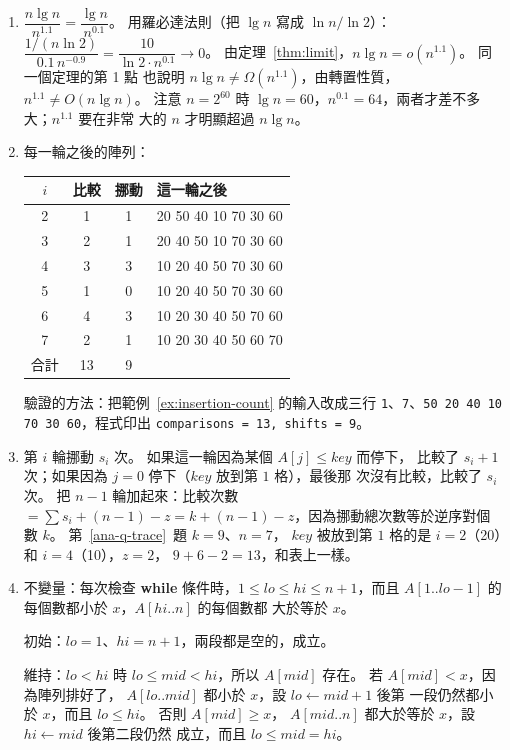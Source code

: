 \begin{enumerate}
\item $\dfrac{n \lg n}{n^{1.1}} = \dfrac{\lg n}{n^{0.1}}$。 用羅必達法則（把 $\lg n$
寫成 $\ln n / \ln 2$）：$\dfrac{1/(n \ln 2)}{0.1\, n^{-0.9}} = \dfrac{10}{\ln 2 \cdot
n^{0.1}} \to 0$。 由定理~\ref{thm:limit}，$n \lg n = o(n^{1.1})$。 同一個定理的第 1 點
也說明 $n \lg n \ne \Omega(n^{1.1})$，由轉置性質，$n^{1.1} \ne O(n \lg n)$。 注意
$n = 2^{60}$ 時 $\lg n = 60$，$n^{0.1} = 64$，兩者才差不多大；$n^{1.1}$ 要在非常
大的 $n$ 才明顯超過 $n \lg n$。

\item 每一輪之後的陣列：
\begin{center}
\begin{tabular}{cccl}
\toprule
$i$ & 比較 & 挪動 & 這一輪之後 \\
\midrule
2 & 1 & 1 & 20 50 40 10 70 30 60 \\
3 & 2 & 1 & 20 40 50 10 70 30 60 \\
4 & 3 & 3 & 10 20 40 50 70 30 60 \\
5 & 1 & 0 & 10 20 40 50 70 30 60 \\
6 & 4 & 3 & 10 20 30 40 50 70 60 \\
7 & 2 & 1 & 10 20 30 40 50 60 70 \\
\midrule
合計 & 13 & 9 & \\
\bottomrule
\end{tabular}
\end{center}
驗證的方法：把範例~\ref{ex:insertion-count} 的輸入改成三行
\texttt{1}、\texttt{7}、\texttt{50 20 40 10 70 30 60}，程式印出
\texttt{comparisons = 13, shifts = 9}。

\item 第 $i$ 輪挪動 $s_i$ 次。 如果這一輪因為某個 $A[j] \le \mathit{key}$ 而停下，
比較了 $s_i + 1$ 次；如果因為 $j = 0$ 停下（$\mathit{key}$ 放到第 $1$ 格），最後那
次沒有比較，比較了 $s_i$ 次。 把 $n - 1$ 輪加起來：比較次數 $= \sum s_i + (n - 1) - z
= k + (n - 1) - z$，因為挪動總次數等於逆序對個數 $k$。 第~\ref{ana-q-trace}~題
$k = 9$、$n = 7$，
$\mathit{key}$ 被放到第 $1$ 格的是 $i = 2$（20）和 $i = 4$（10），$z = 2$，
$9 + 6 - 2 = 13$，和表上一樣。

\item 不變量：每次檢查 \textbf{while} 條件時，$1 \le \mathit{lo} \le \mathit{hi} \le
n + 1$，而且 $A[1..\mathit{lo}-1]$ 的每個數都小於 $x$，$A[\mathit{hi}..n]$ 的每個數都
大於等於 $x$。

初始：$\mathit{lo} = 1$、$\mathit{hi} = n + 1$，兩段都是空的，成立。

維持：$\mathit{lo} < \mathit{hi}$ 時 $\mathit{lo} \le \mathit{mid} < \mathit{hi}$，所以
$A[\mathit{mid}]$ 存在。 若 $A[\mathit{mid}] < x$，因為陣列排好了，
$A[\mathit{lo}..\mathit{mid}]$ 都小於 $x$，設 $\mathit{lo} \gets \mathit{mid} + 1$ 後第
一段仍然都小於 $x$，而且 $\mathit{lo} \le \mathit{hi}$。 否則 $A[\mathit{mid}] \ge x$，
$A[\mathit{mid}..n]$ 都大於等於 $x$，設 $\mathit{hi} \gets \mathit{mid}$ 後第二段仍然
成立，而且 $\mathit{lo} \le \mathit{mid} = \mathit{hi}$。


\end{enumerate}
